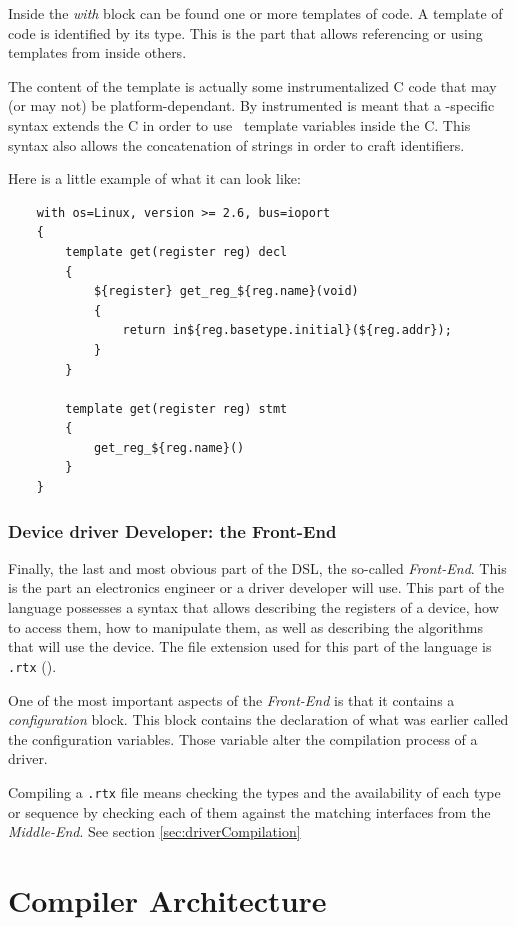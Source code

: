\documentclass[american]{rtxreport}
\begin{document}
Inside the \emph{with} block can be found one or more templates of code. A
template of code is identified by its type. This is the part that allows
referencing or using templates from inside others.

The content of the template is actually some instrumentalized C code that may
(or may not) be platform-dependant. By instrumented is meant that a
\rtx-specific syntax extends the C in order to use \rtx\ template
variables inside the C. This syntax also allows the concatenation of strings
in order to craft identifiers.

Here is a little example of what it can look like:
\begin{lstlisting}
    with os=Linux, version >= 2.6, bus=ioport
    {
        template get(register reg) decl
        {
            ${register} get_reg_${reg.name}(void)
            {
                return in${reg.basetype.initial}(${reg.addr});
            }
        }

        template get(register reg) stmt
        {
            get_reg_${reg.name}()
        }
    }
\end{lstlisting}

\subsection{Device driver Developer: the Front-End}
\lstset{language=rtx}

Finally, the last and most obvious part of the DSL, the so-called
\emph{Front-End}. This is the part an electronics engineer or a driver
developer will use. This part of the language possesses a syntax that allows
describing the registers of a device, how to access them, how to manipulate
them, as well as describing the algorithms that will use the device. The file
extension used for this part of the language is \texttt{.rtx} (\rtx).

One of the most important aspects of the \emph{Front-End} is that it contains a
\emph{configuration} block. This block contains the declaration of what was
earlier called the configuration variables. Those variable alter the compilation
process of a driver.

Compiling a \texttt{.rtx} file means checking the types and the availability of
each type or sequence by checking each of them against the matching interfaces
from the \emph{Middle-End}. See section
\ref{sec:driverCompilation}



\chapter{Compiler Architecture} %
\end{document}
